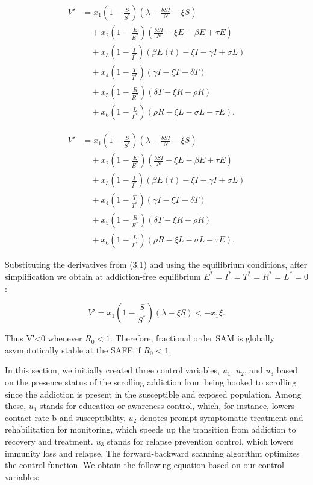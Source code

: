 \documentclass[10pt]{NSP1}
\begin{document}
\[
\begin{matrix}
V' & = x_{1}\left( 1 - \frac{S}{S^{*}} \right)\left( \lambda - \frac{bSI}{N} - \xi S \right) \\ & \quad + x_{2}\left( 1 - \frac{E}{E^{*}} \right)\left( \frac{bSI}{N} - \xi E - \beta E + \tau E \right) \\ & \quad + x_{3}\left( 1 - \frac{I}{I^{*}} \right)\left( \beta E(t) - \xi I - \gamma I + \sigma L \right) \\ & \quad + x_{4}\left( 1 - \frac{T}{T^{*}} \right)(\gamma I - \xi T - \delta T) \\ & \quad + x_{5}\left( 1 - \frac{R}{R^{*}} \right)(\delta T - \xi R - \rho R) \\ & \quad + x_{6}\left( 1 - \frac{L}{L^{*}} \right)(\rho R - \xi L - \sigma L - \tau E).
\end{matrix}
\]

\[
\begin{matrix}
V' & = x_{1}\left( 1 - \frac{S}{S^{*}} \right)\left( \lambda - \frac{bSI}{N} - \xi S \right) \\ & \quad + x_{2}\left( 1 - \frac{E}{E^{*}} \right)\left( \frac{bSI}{N} - \xi E - \beta E + \tau E \right) \\ & \quad + x_{3}\left( 1 - \frac{I}{I^{*}} \right)\left( \beta E(t) - \xi I - \gamma I + \sigma L \right) \\ & \quad + x_{4}\left( 1 - \frac{T}{T^{*}} \right)(\gamma I - \xi T - \delta T) \\ & \quad + x_{5}\left( 1 - \frac{R}{R^{*}} \right)(\delta T - \xi R - \rho R) \\ & \quad + x_{6}\left( 1 - \frac{L}{L^{*}} \right)(\rho R - \xi L - \sigma L - \tau E).
\end{matrix}
\]

Substituting the derivatives from (3.1) and using the equilibrium conditions, after simplification we obtain at addiction-free equilibrium \(E^{*} = I^{*} = T^{*} = R^{*} = L^{*} = 0\):

\[
V' = x_{1}\left( 1 - \frac{S}{S^{*}} \right)(\lambda - \xi S) < - x_{1}\xi.
\]

Thus V′\textless{}0 whenever \(R_{0} < 1\). Therefore, fractional order SAM is globally asymptotically stable at the SAFE if \(R_{0} < 1\).

\par\medskip{}\smallskip

In this section, we initially created three control variables, \(u_{1}\), \(u_{2}\), and \(u_{3}\) based on the presence status of the scrolling addiction from being hooked to scrolling since the addiction is present in the susceptible and exposed population. Among these, \(u_{1}\) stands for education or awareness control, which, for instance, lowers contact rate b and susceptibility. \(u_{2}\) denotes prompt symptomatic treatment and rehabilitation for monitoring, which speeds up the transition from addiction to recovery and treatment. \(u_{3}\) stands for relapse prevention control, which lowers immunity loss and relapse. The forward-backward scanning algorithm optimizes the control function. We obtain the following equation based on our control variables:
\end{document}
